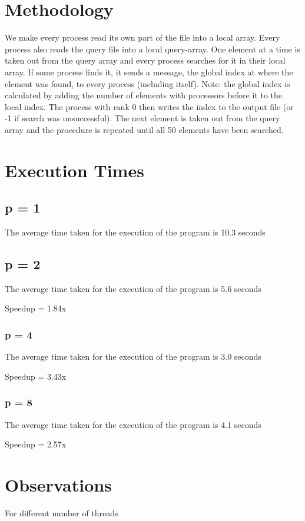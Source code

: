 \documentclass[12pt,letterpaper]{article}
\begin{document}
\section{Methodology}

We make every process read its own part of the file into a local array.
Every process also reads the query file into a local query-array.
One element at a time is taken out from the query array and every process searches for it in their local array. If some process finds it, it sends a message, the global index at where the element was found, to every process (including itself). Note: the global index is calculated by adding the number of elements with processors before it to the local index. The process with rank 0 then writes the index to the output file (or -1 if search was unsuccessful). The next element is taken out from the query array and the procedure is repeated until all 50 elements have been searched.

\section{Execution Times}

\subsection{p = 1}

The average time taken for the execution of the program is 10.3 seconds

\subsection{p = 2}

The average time taken for the execution of the program is 5.6 seconds

Speedup = 1.84x

\subsubsection{p = 4}

The average time taken for the execution of the program is 3.0 seconds

Speedup = 3.43x

\subsubsection{p = 8}

The average time taken for the execution of the program is 4.1 seconds

Speedup = 2.57x

\section{Observations}


For different number of threads
\end{document}
